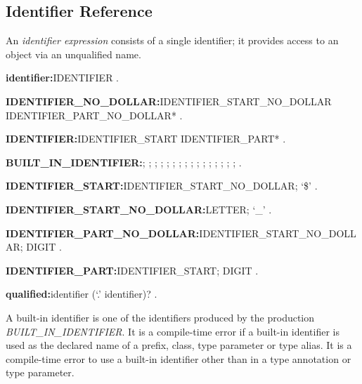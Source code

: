 \documentclass{article}
\begin{document}
\subsection{Identifier Reference}

\LMHash{}
An {\em identifier expression} consists of a single identifier; it provides access to an object via an unqualified name.

\begin{grammar}
{\bf identifier:}IDENTIFIER
  .

{\bf IDENTIFIER\_NO\_DOLLAR:}IDENTIFIER\_START\_NO\_DOLLAR IDENTIFIER\_PART\_NO\_DOLLAR*
  .

{\bf IDENTIFIER:}IDENTIFIER\_START IDENTIFIER\_PART*
  .

{\bf BUILT\_IN\_IDENTIFIER:}\ABSTRACT{};
  \AS{};
  \COVARIANT{};
  \DEFERRED{};
  \DYNAMIC{};
  \EXPORT{};
  \EXTERNAL{};
  \FACTORY{};
  \GET{};
  \IMPLEMENTS{};
  \IMPORT{};
  \LIBRARY{};
  \OPERATOR{};
  \PART{};
  \SET{};
  \STATIC{};
  \TYPEDEF{}
  .

{\bf IDENTIFIER\_START:}IDENTIFIER\_START\_NO\_DOLLAR;
  `\$'
  .

{\bf IDENTIFIER\_START\_NO\_DOLLAR:}LETTER;
  `\_'
  .

{\bf IDENTIFIER\_PART\_NO\_DOLLAR:}IDENTIFIER\_START\_NO\_DOLLAR;
  DIGIT
  .

{\bf IDENTIFIER\_PART:}IDENTIFIER\_START;
  DIGIT
  .

{\bf qualified:}identifier (`{\escapegrammar .}' identifier)?
  .
\end{grammar}

\LMHash{}
A built-in identifier is one of the identifiers produced by the production {\em BUILT\_IN\_IDENTIFIER}.
It is a compile-time error if a built-in identifier is used as the declared name of a prefix, class, type parameter or type alias.
It is a compile-time error to use a built-in identifier other than \DYNAMIC{} in a type annotation or type parameter.

\end{document}
